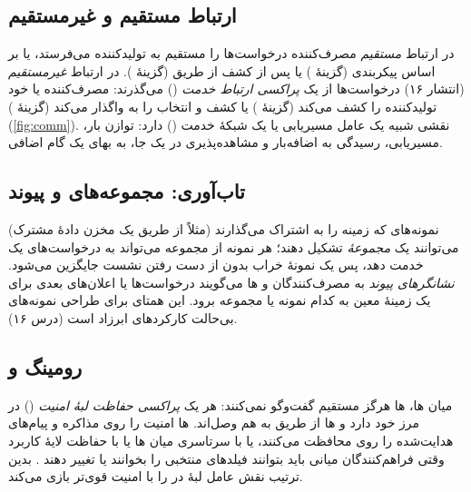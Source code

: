 \documentclass[11pt,a4paper]{article}
\begin{document}
\subsection{ارتباط مستقیم و غیرمستقیم}
در ارتباط \emph{مستقیم} مصرف‌کننده درخواست‌ها را مستقیم به تولیدکننده می‌فرستد، یا بر اساس پیکربندی (گزینهٔ ) یا پس از
کشف از طریق  (گزینهٔ ). در ارتباط \emph{غیرمستقیم} (انتشار ۱۶) درخواست‌ها از یک \emph{پراکسی ارتباط خدمت}
() می‌گذرند: مصرف‌کننده یا خود تولیدکننده را کشف می‌کند (گزینهٔ ) یا کشف و انتخاب را به  واگذار می‌کند
(گزینهٔ ) (\cref{fig:comm}).  نقشی شبیه یک عامل مسیریابی  یا یک شبکهٔ خدمت ()
دارد: توازن بار، مسیریابی، رسیدگی به اضافه‌بار و مشاهده‌پذیری در یک جا، به بهای یک گام اضافی.

\begin{acnfigure}
  \caption{ارتباط مستقیم (گزینه‌های ) و ارتباط غیرمستقیم از طریق  (گزینه‌های ).}
  \label{fig:comm}
\end{acnfigure}

\subsection{تاب‌آوری: مجموعه‌های  و پیوند}
نمونه‌های  که زمینه را به اشتراک می‌گذارند (مثلاً از طریق یک مخزن دادهٔ مشترک) می‌توانند یک \emph{مجموعهٔ }
تشکیل دهند؛ هر نمونه از مجموعه می‌تواند به درخواست‌های یک  خدمت دهد، پس یک نمونهٔ خراب بدون از دست رفتن نشست جایگزین
می‌شود. \emph{نشانگرهای پیوند} به مصرف‌کنندگان و ها می‌گویند درخواست‌ها یا اعلان‌های بعدی برای یک زمینهٔ معین به کدام
نمونه یا مجموعه برود. این همتای  برای طراحی نمونه‌های بی‌حالت کارکردهای ابرزاد است (درس ۱۶).

\subsection{رومینگ و }
میان ها، ها هرگز مستقیم گفت‌وگو نمی‌کنند: هر  یک \emph{پراکسی حفاظت لبهٔ امنیت} ()
در مرز خود دارد و ها از طریق  به هم وصل‌اند. ها امنیت را روی  مذاکره و پیام‌های
هدایت‌شده را روی  محافظت می‌کنند، یا با  سرتاسری میان ها یا با حفاظت لایهٔ کاربرد وقتی فراهم‌کنندگان
میانی  باید بتوانند فیلدهای منتخبی را بخوانند یا تغییر دهند \cite{ts33501}. بدین ترتیب  نقش عامل لبهٔ
 در  را با امنیت قوی‌تر بازی می‌کند.
\end{document}
